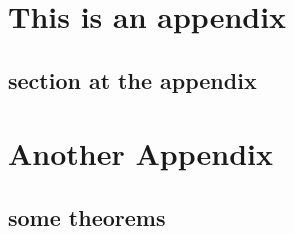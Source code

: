 \chapter{This is an appendix}

\lipsum[1-20]
\section{section at the appendix}

\lipsum[1-2]

\chapter{Another Appendix}

\lipsum[1-5]

\section{some theorems}

\lipsum[1-2]